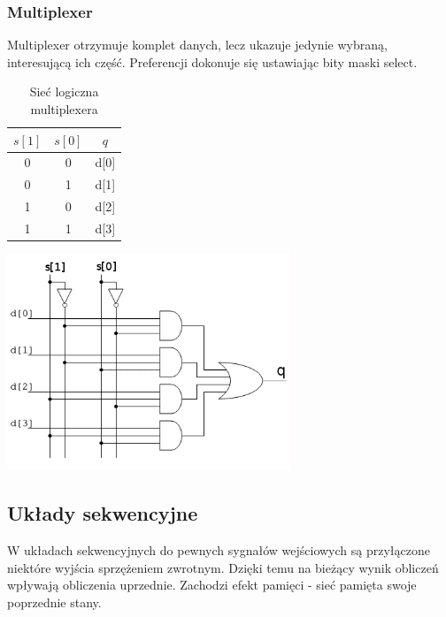 \documentclass[a4paper,12pt]{article}
\begin{document}
\subsubsection{Multiplexer}

Multiplexer otrzymuje komplet danych, lecz ukazuje jedynie wybraną, interesującą ich część. Preferencji dokonuje się ustawiając bity maski select.

\begin{table}[h!]
\centering

\begin{minipage}{5.5cm}
\centering

\begin{tabular}{ | c | c || c | }
  \hline
  $s[1]$ & $s[0]$ & $q$ \\ \hline
  0 & 0 & d[0] \\
  0 & 1 & d[1] \\
  1 & 0 & d[2] \\
  1 & 1 & d[3] \\
  \hline
\end{tabular}
\end{minipage}
\begin{minipage}{11cm}
   \centering
   \includegraphics[width=8.5cm]{grafika/obwody/mux.jpg}
   \caption*{Sieć logiczna multiplexera}
\end{minipage}
\end{table}


\subsection{Układy sekwencyjne}

W układach sekwencyjnych do pewnych sygnałów wejściowych są przyłączone niektóre wyjścia sprzężeniem zwrotnym. Dzięki temu na bieżący wynik obliczeń wpływają obliczenia uprzednie. Zachodzi efekt pamięci - sieć pamięta swoje poprzednie stany.
\end{document}
